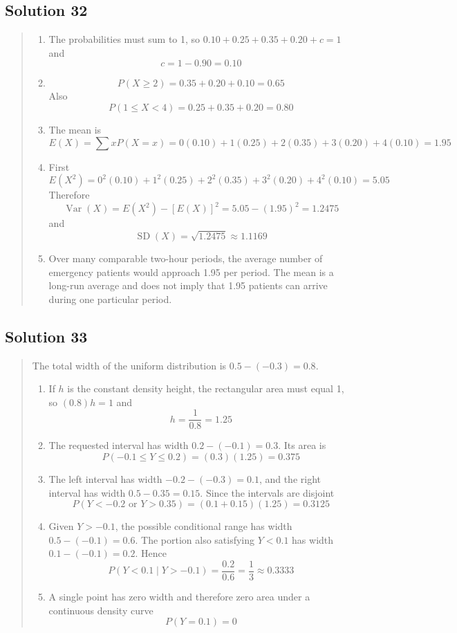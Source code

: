 \documentclass[10pt,letterpaper]{article}
\newcommand{\solutionheading}[1]{%
  \subsection*{Solution #1}
}
\newenvironment{answer}{%
  \begin{quote}\small\color{black}
}{%
  \end{quote}
}
\begin{document}
\solutionheading{32}
\begin{answer}
\begin{enumerate}
	\item The probabilities must sum to 1, so $0.10+0.25+0.35+0.20+c=1$ and
	$$c=1-0.90=0.10$$
	\item
	$$P(X\geq2)=0.35+0.20+0.10=0.65$$
	Also
	$$P(1\leq X<4)=0.25+0.35+0.20=0.80$$
	\item The mean is
	$$E(X)=\sum xP(X=x)=0(0.10)+1(0.25)+2(0.35)+3(0.20)+4(0.10)=1.95$$
  	\item First
	$$E(X^2)=0^2(0.10)+1^2(0.25)+2^2(0.35)+3^2(0.20)+4^2(0.10)=5.05$$
  	Therefore
	$$\operatorname{Var}(X)=E(X^2)-[E(X)]^2=5.05-(1.95)^2=1.2475$$
  	and
	$$\operatorname{SD}(X)=\sqrt{1.2475}\approx1.1169$$
	\item Over many comparable two-hour periods, the average number of emergency patients would approach 1.95 per period. The mean is a long-run average and does not imply that 1.95 patients can arrive during one particular period.
\end{enumerate}
\end{answer}

\solutionheading{33}
\begin{answer}
The total width of the uniform distribution is $0.5-(-0.3)=0.8$.
\begin{enumerate}
	\item If $h$ is the constant density height, the rectangular area must equal 1, so $(0.8)h=1$ and
	$$h=\frac{1}{0.8}=1.25$$
	\item The requested interval has width $0.2-(-0.1)=0.3$. Its area is
	$$P(-0.1\leq Y\leq0.2)=(0.3)(1.25)=0.375$$
	\item The left interval has width $-0.2-(-0.3)=0.1$, and the right interval has width $0.5-0.35=0.15$. Since the intervals are disjoint
	$$P(Y<-0.2\text{ or }Y>0.35)=(0.1+0.15)(1.25)=0.3125$$
	\item Given $Y>-0.1$, the possible conditional range has width $0.5-(-0.1)=0.6$. The portion also satisfying $Y<0.1$ has width $0.1-(-0.1)=0.2$. Hence
	$$P(Y<0.1\mid Y>-0.1)=\frac{0.2}{0.6}=\frac13\approx0.3333$$
	\item A single point has zero width and therefore zero area under a continuous density curve
	$$P(Y=0.1)=0$$
\end{enumerate}
\end{answer}
\end{document}
